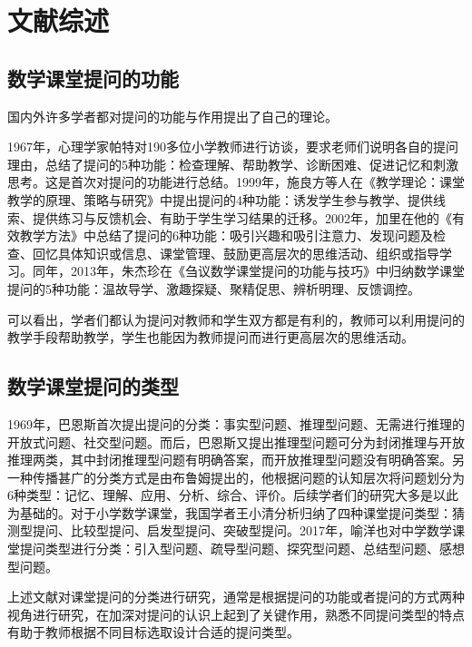 \chapter{文献综述}


\section{数学课堂提问的功能}

国内外许多学者都对提问的功能与作用提出了自己的理论。

1967年，心理学家帕特对190多位小学教师进行访谈，要求老师们说明各自的提问理由，总结了提问的5种功能：检查理解、帮助教学、诊断困难、促进记忆和刺激思考。这是首次对提问的功能进行总结。1999年，施良方等人在《教学理论：课堂教学的原理、策略与研究》中提出提问的4种功能：诱发学生参与教学、提供线索、提供练习与反馈机会、有助于学生学习结果的迁移\cite{施良方1999教学理论}。2002年，加里在他的《有效教学方法》中总结了提问的6种功能：吸引兴趣和吸引注意力、发现问题及检查、回忆具体知识或信息、课堂管理、鼓励更高层次的思维活动、组织或指导学习\cite{鲍里奇2002有效教学方法}。同年，2013年，朱杰珍在《刍议数学课堂提问的功能与技巧》中归纳数学课堂提问的5种功能：温故导学、激趣探疑、聚精促思、辨析明理、反馈调控\cite{朱杰珍2013刍议数学课堂提问的功能与技巧}。

可以看出，学者们都认为提问对教师和学生双方都是有利的，教师可以利用提问的教学手段帮助教学，学生也能因为教师提问而进行更高层次的思维活动。



\section{数学课堂提问的类型}

1969年，巴恩斯首次提出提问的分类：事实型问题、推理型问题、无需进行推理的开放式问题、社交型问题。而后，巴恩斯又提出推理型问题可分为封闭推理与开放推理两类，其中封闭推理型问题有明确答案，而开放推理型问题没有明确答案。另一种传播甚广的分类方式是由布鲁姆提出的，他根据问题的认知层次将问题划分为6种类型：记忆、理解、应用、分析、综合、评价。后续学者们的研究大多是以此为基础的。对于小学数学课堂，我国学者王小清分析归纳了四种课堂提问类型：猜测型提问、比较型提问、启发型提问、突破型提问\cite{王小清2020小学数学课堂提问类型探究}。2017年，喻洋也对中学数学课堂提问类型进行分类：引入型问题、疏导型问题、探究型问题、总结型问题、感想型问题\cite{喻洋2017中学数学课堂提问的类型与技巧}。

上述文献对课堂提问的分类进行研究，通常是根据提问的功能或者提问的方式两种视角进行研究，在加深对提问的认识上起到了关键作用，熟悉不同提问类型的特点有助于教师根据不同目标选取设计合适的提问类型。



